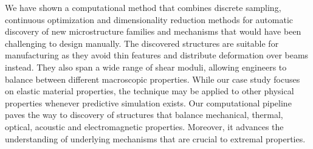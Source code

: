 We have shown a computational method that combines discrete sampling, continuous optimization and dimensionality reduction methods for automatic discovery of new microstructure families and mechanisms that would have been challenging to design manually.
The discovered structures are suitable for manufacturing as they avoid thin features and distribute deformation over beams instead. They also span a wide range of shear moduli, allowing engineers to balance between different macroscopic properties. While our case study focuses on elastic material properties, the technique may be applied to other physical properties whenever predictive simulation exists. Our computational pipeline paves the way to discovery of structures that balance mechanical, thermal, optical, acoustic and electromagnetic properties. Moreover, it advances the understanding of underlying mechanisms that are crucial to extremal properties.
